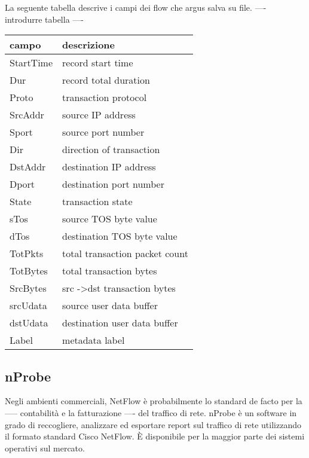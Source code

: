 \documentclass[../main.tex]{subfiles}
\begin{document}
La seguente tabella descrive i campi dei flow che argus salva su file.
---- introdurre tabella ----

\begin{table}[h]
\begin{tabular}{|l|l|}
\hline
\textbf{campo} & \textbf{descrizione}                    \\ \hline
StartTime      & record start time                       \\ \hline
Dur            & record total duration                   \\ \hline
Proto          & transaction protocol                    \\ \hline
SrcAddr        & source IP address                       \\ \hline
Sport          & source port number                      \\ \hline
Dir            & direction of transaction                \\ \hline
DstAddr        & destination IP address                  \\ \hline
Dport          & destination port number                 \\ \hline
State          & transaction state                       \\ \hline
sTos           & source TOS byte value                   \\ \hline
dTos           & destination TOS byte value              \\ \hline
TotPkts        & total transaction packet count          \\ \hline
TotBytes       & total transaction bytes                 \\ \hline
SrcBytes       & src -\textgreater dst transaction bytes \\ \hline
srcUdata       & source user data buffer                 \\ \hline
dstUdata       & destination user data buffer            \\ \hline
Label          & metadata label                          \\ \hline
\end{tabular}
\end{table}

\subsection{nProbe}

Negli ambienti commerciali, NetFlow è probabilmente lo standard de facto per la ----- contabilità e la fatturazione ---- del traffico di rete. nProbe è un software in grado di reccogliere, analizzare ed esportare report sul traffico di rete utilizzando il formato standard Cisco NetFlow. È disponibile per la maggior parte dei sistemi operativi sul mercato. \newline
\end{document}
